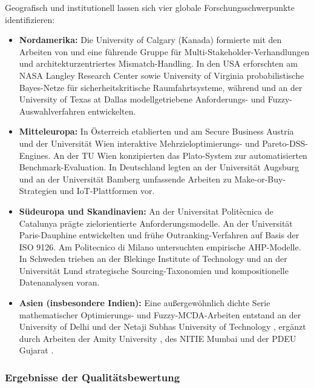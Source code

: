 Geografisch und institutionell lassen sich vier globale Forschungsschwerpunkte identifizieren:
\begin{itemize}[leftmargin=*]
  \item \textbf{Nordamerika:} Die University of Calgary (Kanada) formierte mit den Arbeiten von \textcite{CZZ6XQZJ} und \textcite{9F79VAAB} eine führende Gruppe für Multi-Stakeholder-Verhandlungen und architekturzentriertes Mismatch-Handling. In den USA erforschten \textcite{QDUNCXFC} am NASA Langley Research Center sowie University of Virginia probabilistische Bayes-Netze für sicherheitskritische Raumfahrtsysteme, während \textcite{CI86GRRG} und \textcite{6RNULWVY} an der University of Texas at Dallas modellgetriebene Anforderungs- und Fuzzy-Auswahlverfahren entwickelten.
      \item \textbf{Mitteleuropa:} In Österreich etablierten \textcite{ZQMG69VT} und \textcite{MZ8JHDYA} am Secure Business Austria und der Universität Wien interaktive Mehrzieloptimierungs- und Pareto-DSS-Engines. An der TU Wien konzipierten \textcite{8VHUMEKY} das Plato-System zur automatisierten Benchmark-Evaluation. In Deutschland legten \textcite{WBGP3ETU} an der Universität Augsburg und \textcite{RRU375GB} an der Universität Bamberg umfassende Arbeiten zu Make-or-Buy-Strategien und IoT-Plattformen vor.
  \item \textbf{Südeuropa und Skandinavien:} An der Universitat Politècnica de Catalunya prägte \textcite{TLB687YL} zielorientierte Anforderungsmodelle. An der Universität Paris-Dauphine entwickelten \textcite{LZQJ6M4X} und \textcite{M3B2D3GD} frühe Outranking-Verfahren auf Basis der ISO 9126. Am Politecnico di Milano untersuchten \textcite{DAU8NSK8} empirische AHP-Modelle. In Schweden trieben \textcite{JT5X3FIG} an der Blekinge Institute of Technology und \textcite{UK2X9C4W} an der Universität Lund strategische Sourcing-Taxonomien und kompositionelle Datenanalysen voran.
  \item \textbf{Asien (insbesondere Indien):} Eine außergewöhnlich dichte Serie mathematischer Optimierungs- und Fuzzy-MCDA-Arbeiten entstand an der University of Delhi und der Netaji Subhas University of Technology \parencite{VUVLUN85, 6YJHIVHG, P9SATBH5, B7ZTQCZZ, JX4RDRDU, YVWGHAWQ, 8KF4HAZS}, ergänzt durch Arbeiten der Amity University \parencite{DFASRUVC}, des NITIE Mumbai \parencite{U4E7VXQU} und der PDEU Gujarat \parencite{5BBYQCJB}.
\end{itemize}

\subsubsection{Ergebnisse der Qualitätsbewertung}
\label{subsubsec:qa_ergebnisse}

